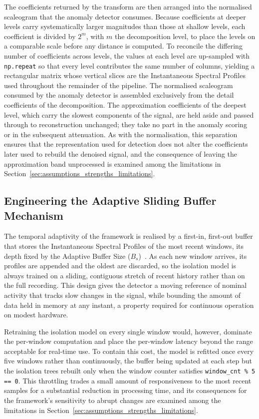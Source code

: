 \documentclass[MScCS,12pt,oneside,final]{uccthesis}
\begin{document}
The coefficients returned by the transform are then arranged into the normalised scaleogram that the anomaly detector consumes. Because coefficients at deeper levels carry systematically larger magnitudes than those at shallow levels, each coefficient is divided by $2^{m}$, with $m$ the decomposition level, to place the levels on a comparable scale before any distance is computed. To reconcile the differing number of coefficients across levels, the values at each level are up-sampled with \texttt{np.repeat} so that every level contributes the same number of columns, yielding a rectangular matrix whose vertical slices are the Instantaneous Spectral Profiles used throughout the remainder of the pipeline. The normalised scaleogram consumed by the anomaly detector is assembled exclusively from the detail coefficients of the decomposition. The approximation coefficients of the deepest level, which carry the slowest components of the signal, are held aside and passed through to reconstruction unchanged; they take no part in the anomaly scoring or in the subsequent attenuation. As with the normalisation, this separation ensures that the representation used for detection does not alter the coefficients later used to rebuild the denoised signal, and the consequence of leaving the approximation band unprocessed is examined among the limitations in Section~\ref{sec:assumptions_strengths_limitations}.

\subsection{Engineering the Adaptive Sliding Buffer Mechanism}
\label{subsec:eng_sliding_buffer}
 
The temporal adaptivity of the framework is realised by a first-in, first-out buffer that stores the Instantaneous Spectral Profiles of the most recent windows, its depth fixed by the Adaptive Buffer Size ($B_s$)~\parencite{longo2025oneegwavelad}. As each new window arrives, its profiles are appended and the oldest are discarded, so the isolation model is always trained on a sliding, contiguous stretch of recent history rather than on the full recording. This design gives the detector a moving reference of nominal activity that tracks slow changes in the signal, while bounding the amount of data held in memory at any instant, a property required for continuous operation on modest hardware.

Retraining the isolation model on every single window would, however, dominate the per-window computation and place the per-window latency beyond the range acceptable for real-time use. To contain this cost, the model is refitted once every five windows rather than continuously, the buffer being updated at each step but the isolation trees rebuilt only when the window counter satisfies \texttt{window\_cnt \% 5 == 0}. This throttling trades a small amount of responsiveness to the most recent samples for a substantial reduction in processing time, and its consequences for the framework's sensitivity to abrupt changes are examined among the limitations in Section~\ref{sec:assumptions_strengths_limitations}.
\end{document}
